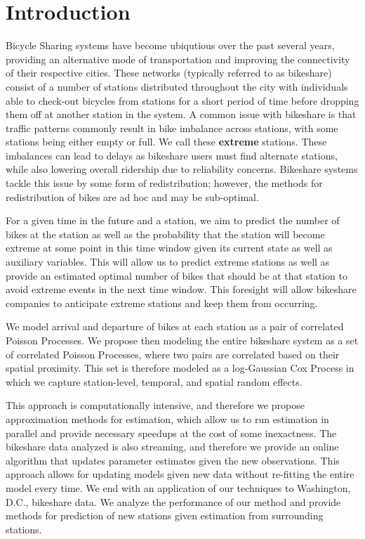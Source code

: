 \documentclass{acm_proc_article-sp}
\begin{document}

\section{Introduction}

Bicycle Sharing systems have become ubiqutious over the past several years, providing an alternative mode of transportation and improving the connectivity of their respective cities.  These networks (typically referred to as bikeshare) consist of a number of stations distributed throughout the city with individuals able to check-out bicycles from stations for a short period of time before dropping them off at another station in the system.  A common issue with bikeshare is that traffic patterns commonly result in bike imbalance across stations, with some stations being either empty or full.  We call these {\bf extreme} stations.  These imbalances can lead to delays as bikeshare users must find alternate stations, while also lowering overall ridership due to reliability concerns. Bikeshare systems tackle this issue by some form of redistribution; however, the methods for redistribution of bikes are ad hoc and may be sub-optimal.

For a given time in the future and a station, we aim to predict the number of bikes at the station as well as the probability that the station will become extreme at some point in this time window given its current state as well as auxiliary variables.  This will allow us to predict extreme stations as well as provide an estimated optimal number of bikes that should be at that station to avoid extreme events in the next time window. This foresight will allow bikeshare companies to anticipate extreme stations and keep them from occurring.

We model arrival and departure of bikes at each station as a pair of correlated Poisson Processes.  We propose then modeling the entire bikeshare system as a set of correlated Poisson Processes, where two pairs are correlated based on their spatial proximity.  This set is therefore modeled as a log-Gaussian Cox Process in which we capture station-level, temporal, and spatial random effects.  

This approach is computationally intensive, and therefore we propose approximation methods for estimation, which allow us to run estimation in parallel and provide necessary speedups at the cost of some inexactness.  The bikeshare data analyzed is also streaming, and therefore we provide an online algorithm that updates parameter estimates given the new observations.  This approach allows for updating models given new data without re-fitting the entire model every time.  We end with an application of our techniques to Washington, D.C., bikeshare data.  We analyze the performance of our method and provide methods for prediction of new stations given estimation from surrounding stations.
\end{document}
